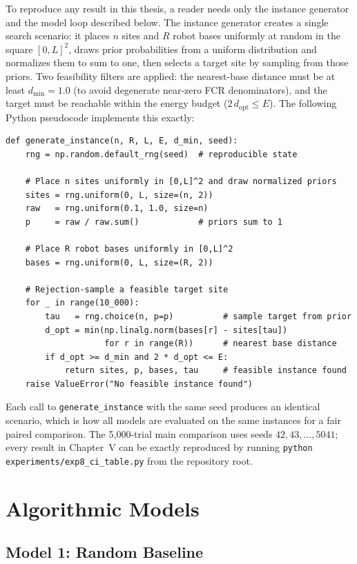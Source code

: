 \begin{doublespacing}
To reproduce any result in this thesis, a reader needs only the instance
generator and the model loop described below. The instance generator
creates a single search scenario: it places $n$ sites and $R$ robot bases
uniformly at random in the square $[0, L]^2$, draws prior probabilities
from a uniform distribution and normalizes them to sum to one, then
selects a target site by sampling from those priors. Two feasibility
filters are applied: the nearest-base distance must be at least
$d_{\min} = 1.0$ (to avoid degenerate near-zero FCR denominators), and
the target must be reachable within the energy budget ($2\,d_{\mathrm{opt}}
\leq E$). The following Python pseudocode implements this exactly:

{\small\begin{verbatim}
def generate_instance(n, R, L, E, d_min, seed):
    rng = np.random.default_rng(seed)  # reproducible state

    # Place n sites uniformly in [0,L]^2 and draw normalized priors
    sites = rng.uniform(0, L, size=(n, 2))
    raw   = rng.uniform(0.1, 1.0, size=n)
    p     = raw / raw.sum()            # priors sum to 1

    # Place R robot bases uniformly in [0,L]^2
    bases = rng.uniform(0, L, size=(R, 2))

    # Rejection-sample a feasible target site
    for _ in range(10_000):
        tau   = rng.choice(n, p=p)          # sample target from prior
        d_opt = min(np.linalg.norm(bases[r] - sites[tau])
                    for r in range(R))      # nearest base distance
        if d_opt >= d_min and 2 * d_opt <= E:
            return sites, p, bases, tau     # feasible instance found
    raise ValueError("No feasible instance found")
\end{verbatim}}

Each call to \texttt{generate\_instance} with the same seed produces an
identical scenario, which is how all models are evaluated on the same
instances for a fair paired comparison. The 5{,}000-trial main comparison
uses seeds $42, 43, \ldots, 5041$; every result in Chapter~V can be
exactly reproduced by running \texttt{python experiments/exp8\_ci\_table.py}
from the repository root.

\section{Algorithmic Models}

\subsection{Model 1: Random Baseline}


\end{doublespacing}
